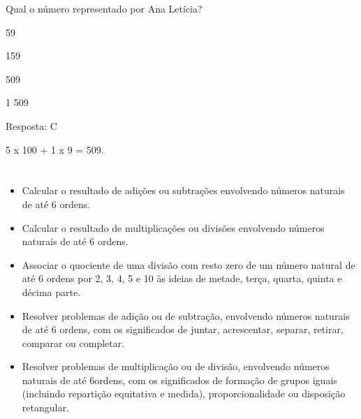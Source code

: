 Qual o número representado por Ana Letícia?

\begin{escolha}

\item
  59
\item
  159
\item
  509
\item
  1 509
\end{escolha}

Resposta: C

5 x 100 + 1 x 9 = 509.

\chapter{}


\begin{itemize}
    \item Calcular o resultado de adições ou subtrações envolvendo números
naturais de até 6 ordens.

    \item Calcular o resultado de multiplicações ou divisões envolvendo números
naturais de até 6 ordens.

    \item Associar o quociente de uma divisão com resto zero de um número
natural de até 6 ordens por 2, 3, 4, 5 e 10 às ideias de metade, terça,
quarta, quinta e décima parte.

    \item Resolver problemas de adição ou de subtração, envolvendo números
naturais de até 6 ordens, com os significados de juntar, acrescentar,
separar, retirar, comparar ou completar.

    \item Resolver problemas de multiplicação ou de divisão, envolvendo números
naturais de até 6ordens, com os significados de formação de grupos
iguais (incluindo repartição equitativa e medida), proporcionalidade ou
disposição retangular.
\end{itemize}


